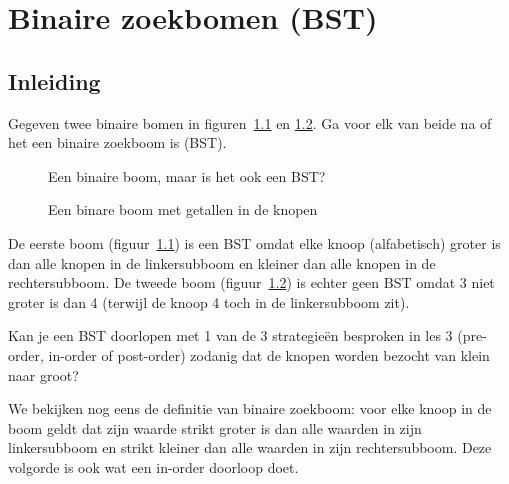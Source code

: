 \chapter{Binaire zoekbomen (BST)}


\section*{Inleiding}

\begin{oef}
\papier Gegeven twee binaire bomen in figuren~\ref{fig:BSToef1} en \ref{fig:oefBST2}. Ga voor elk van beide na of het een binaire zoekboom is (BST).
\begin{figure}[htbp]
    \centering
{}
\caption{Een binaire boom, maar is het ook een BST?}
    \label{fig:BSToef1}
\end{figure}

\begin{figure}[htbp]
    \centering
{}
\caption{Een binare boom met getallen in de knopen}
    \label{fig:oefBST2}
\end{figure}

\begin{opl}
De eerste boom (figuur~\ref{fig:BSToef1}) is een BST omdat elke knoop (alfabetisch) groter is dan alle knopen in de linkersubboom en kleiner dan alle knopen in de rechtersubboom. De tweede boom (figuur~\ref{fig:oefBST2}) is echter geen BST omdat 3 niet groter is dan 4 (terwijl de knoop 4 toch in de linkersubboom zit).
\end{opl}
\end{oef}



\newpage
\begin{oef}
\papier Kan je een BST doorlopen met 1 van de 3 strategie\"en besproken in les 3 (pre-order, in-order of post-order) zodanig dat de knopen worden bezocht van klein naar groot?
\begin{opl}
We bekijken nog eens de definitie van binaire zoekboom: voor elke knoop in de boom geldt dat zijn waarde strikt groter is dan alle waarden in zijn linkersubboom en strikt kleiner dan alle waarden in zijn rechtersubboom. Deze volgorde is ook wat een in-order doorloop doet.
\end{opl}
\end{oef}





